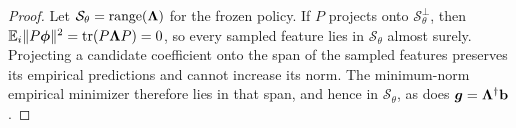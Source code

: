 \begin{proof}






    Let $\mathcal S_\theta=\operatorname{range}(\boldsymbol{\Lambda})$ for the frozen policy.
If $P$ projects onto $\mathcal S_\theta^\perp$, then
$\mathbb{E}_i\|P\boldsymbol{\phi}\|^2=\operatorname{tr}(P\boldsymbol{\Lambda} P)=0$, so every sampled feature
lies in $\mathcal S_\theta$ almost surely. Projecting a candidate coefficient
onto the span of the sampled features preserves its empirical predictions
and cannot increase its norm. The minimum-norm empirical minimizer therefore
lies in that span, and hence in $\mathcal S_\theta$, as does
$\bm{g}=\boldsymbol{\Lambda}^\dagger\mathbf{b}$.


\end{proof}
